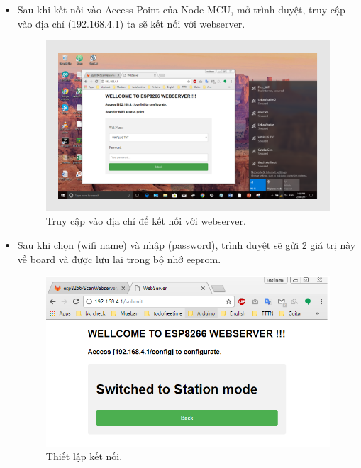 \documentclass[a4paper,12pt,oneside]{article}
\begin{document}
\begin{enumerate}
\begin{itemize}
\begin{itemize}
			\item Sau khi kết nối vào Access Point của Node MCU, mở trình duyệt, truy cập vào địa chỉ (192.168.4.1) ta sẽ kết nối với webserver.
			\begin{figure}[H]
			\centering
			\includegraphics[scale=.9]{hinh/webserver_2.PNG}
			\caption{Truy cập vào địa chỉ để kết nối với webserver.}
			\end{figure}
			
			\item Sau khi chọn (wifi name) và nhập (password), trình duyệt sẽ gửi 2 giá trị này về board và được lưu lại trong bộ nhớ eeprom.
			\begin{figure}[H]
			\centering
			\includegraphics[scale=.8]{hinh/webserver_3.PNG}
			\caption{Thiết lập kết nối.}
			\end{figure}
			

\end{itemize}
\end{itemize}
\end{enumerate}
\end{document}
